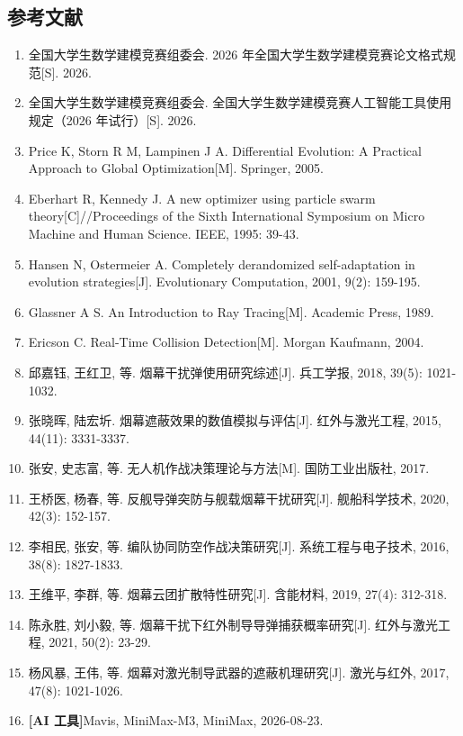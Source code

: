 \subsection{参考文献}

\begin{sloppypar}
\begin{enumerate}
  \item 全国大学生数学建模竞赛组委会. 2026 年全国大学生数学建模竞赛论文格式规范[S]. 2026.
  \item 全国大学生数学建模竞赛组委会. 全国大学生数学建模竞赛人工智能工具使用规定（2026 年试行）[S]. 2026.
  \item Price K, Storn R M, Lampinen J A. Differential Evolution: A Practical Approach to Global Optimization[M]. Springer, 2005.
  \item Eberhart R, Kennedy J. A new optimizer using particle swarm theory[C]//Proceedings of the Sixth International Symposium on Micro Machine and Human Science. IEEE, 1995: 39-43.
  \item Hansen N, Ostermeier A. Completely derandomized self-adaptation in evolution strategies[J]. Evolutionary Computation, 2001, 9(2): 159-195.
  \item Glassner A S. An Introduction to Ray Tracing[M]. Academic Press, 1989.
  \item Ericson C. Real-Time Collision Detection[M]. Morgan Kaufmann, 2004.
  \item 邱嘉钰, 王红卫, 等. 烟幕干扰弹使用研究综述[J]. 兵工学报, 2018, 39(5): 1021-1032.
  \item 张晓晖, 陆宏圻. 烟幕遮蔽效果的数值模拟与评估[J]. 红外与激光工程, 2015, 44(11): 3331-3337.
  \item 张安, 史志富, 等. 无人机作战决策理论与方法[M]. 国防工业出版社, 2017.
  \item 王桥医, 杨春, 等. 反舰导弹突防与舰载烟幕干扰研究[J]. 舰船科学技术, 2020, 42(3): 152-157.
  \item 李相民, 张安, 等. 编队协同防空作战决策研究[J]. 系统工程与电子技术, 2016, 38(8): 1827-1833.
  \item 王维平, 李群, 等. 烟幕云团扩散特性研究[J]. 含能材料, 2019, 27(4): 312-318.
  \item 陈永胜, 刘小毅, 等. 烟幕干扰下红外制导导弹捕获概率研究[J]. 红外与激光工程, 2021, 50(2): 23-29.
  \item 杨风暴, 王伟, 等. 烟幕对激光制导武器的遮蔽机理研究[J]. 激光与红外, 2017, 47(8): 1021-1026.
  \item \textbf{[AI 工具]}Mavis, MiniMax-M3, MiniMax, 2026-08-23.
\end{enumerate}
\end{sloppypar}

